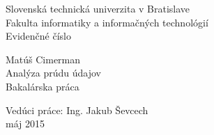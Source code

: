 \documentclass[11pt, a4paper, titlepage, slovak]{book}
\begin{document}
\sloppy %




\frontmatter

\begin{titlepage}
\begin{center}                                                                                                                                                   
{\Large Slovenská technická univerzita v Bratislave} \\
{\Large Fakulta informatiky a informačných technológií} \\
\vspace*{1\baselineskip}
\large {Evidenčné číslo}
\vfill %


{\LARGE {Matúš Cimerman}} \\
\vspace*{1\baselineskip}
{\huge {Analýza prúdu údajov}} %
\\
\vspace*{1\baselineskip}
{\Large {Bakalárska práca}}\\
\vfill %
\end{center}
{Vedúci práce: Ing. Jakub Ševcech}\\
\vspace*{1\baselineskip}
{máj 2015}

\end{titlepage}
\restoregeometry
\thispagestyle{empty}
\emptydoublepage

%


\emptydoublepage


\emptydoublepage

%
\end{document}
